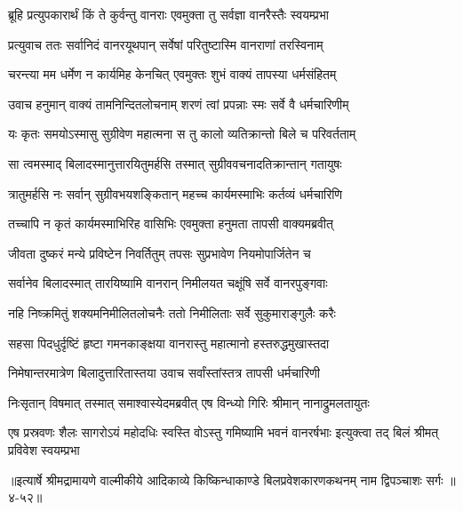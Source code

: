 \twolineshloka
{ब्रूहि प्रत्युपकारार्थं किं ते कुर्वन्तु वानराः}
{एवमुक्ता तु सर्वज्ञा वानरैस्तैः स्वयम्प्रभा} %

\twolineshloka
{प्रत्युवाच ततः सर्वानिदं वानरयूथपान्}
{सर्वेषां परितुष्टास्मि वानराणां तरस्विनाम्} %

\twolineshloka
{चरन्त्या मम धर्मेण न कार्यमिह केनचित्}
{एवमुक्तः शुभं वाक्यं तापस्या धर्मसंहितम्} %

\twolineshloka
{उवाच हनुमान् वाक्यं तामनिन्दितलोचनाम्}
{शरणं त्वां प्रपन्नाः स्मः सर्वे वै धर्मचारिणीम्} %

\twolineshloka
{यः कृतः समयोऽस्मासु सुग्रीवेण महात्मना}
{स तु कालो व्यतिक्रान्तो बिले च परिवर्तताम्} %

\twolineshloka
{सा त्वमस्माद् बिलादस्मानुत्तारयितुमर्हसि}
{तस्मात् सुग्रीववचनादतिक्रान्तान् गतायुषः} %

\twolineshloka
{त्रातुमर्हसि नः सर्वान् सुग्रीवभयशङ्कितान्}
{महच्च कार्यमस्माभिः कर्तव्यं धर्मचारिणि} %

\twolineshloka
{तच्चापि न कृतं कार्यमस्माभिरिह वासिभिः}
{एवमुक्ता हनुमता तापसी वाक्यमब्रवीत्} %

\twolineshloka
{जीवता दुष्करं मन्ये प्रविष्टेन निवर्तितुम्}
{तपसः सुप्रभावेण नियमोपार्जितेन च} %

\twolineshloka
{सर्वानेव बिलादस्मात् तारयिष्यामि वानरान्}
{निमीलयत चक्षूंषि सर्वे वानरपुङ्गवाः} %

\twolineshloka
{नहि निष्क्रमितुं शक्यमनिमीलितलोचनैः}
{ततो निमीलिताः सर्वे सुकुमाराङ्गुलैः करैः} %

\twolineshloka
{सहसा पिदधुर्दृष्टिं हृष्टा गमनकाङ्क्षया}
{वानरास्तु महात्मानो हस्तरुद्धमुखास्तदा} %

\twolineshloka
{निमेषान्तरमात्रेण बिलादुत्तारितास्तया}
{उवाच सर्वांस्तांस्तत्र तापसी धर्मचारिणी} %

\twolineshloka
{निःसृतान् विषमात् तस्मात् समाश्वास्येदमब्रवीत्}
{एष विन्ध्यो गिरिः श्रीमान् नानाद्रुमलतायुतः} %

\threelineshloka
{एष प्रस्रवणः शैलः सागरोऽयं महोदधिः}
{स्वस्ति वोऽस्तु गमिष्यामि भवनं वानरर्षभाः}
{इत्युक्त्वा तद् बिलं श्रीमत् प्रविवेश स्वयम्प्रभा} %


॥इत्यार्षे श्रीमद्रामायणे वाल्मीकीये आदिकाव्ये किष्किन्धाकाण्डे बिलप्रवेशकारणकथनम् नाम द्विपञ्चाशः सर्गः ॥४-५२॥
